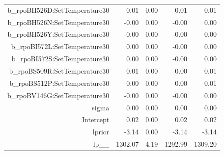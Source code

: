 \begin{table}[ht]
\begin{tabular}{rrrrr}
  b\_rpoBH526D:SetTemperature30 & 0.01 & 0.00 & 0.01 & 0.01 \\ 
  b\_rpoBH526N:SetTemperature30 & -0.00 & 0.00 & -0.00 & 0.00 \\ 
  b\_rpoBH526Y:SetTemperature30 & -0.00 & 0.00 & -0.00 & 0.00 \\ 
  b\_rpoBI572L:SetTemperature30 & 0.00 & 0.00 & -0.00 & 0.00 \\ 
  b\_rpoBI572S:SetTemperature30 & 0.00 & 0.00 & -0.00 & 0.00 \\ 
  b\_rpoBS509R:SetTemperature30 & 0.01 & 0.00 & 0.00 & 0.01 \\ 
  b\_rpoBS512P:SetTemperature30 & 0.00 & 0.00 & 0.00 & 0.01 \\ 
  b\_rpoBV146G:SetTemperature30 & -0.00 & 0.00 & -0.00 & 0.00 \\ 
  sigma & 0.00 & 0.00 & 0.00 & 0.00 \\ 
  Intercept & 0.02 & 0.00 & 0.02 & 0.02 \\ 
  lprior & -3.14 & 0.00 & -3.14 & -3.14 \\ 
  lp\_\_ & 1302.07 & 4.19 & 1292.99 & 1309.20 \\ 
   \hline
\end{tabular}
\end{table}
